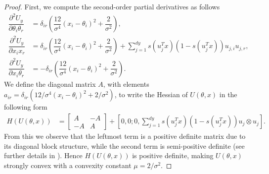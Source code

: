 \documentclass[a4paper, 10pt]{article}
\theoremstyle{plain}%
\begin{document}
\begin{proof}
    First, we compute the second-order partial derivatives as follows
    \begin{align*}
\dfrac{\partial^2 U_y}{\partial \theta_i \theta_r}&=\delta_{ir}\left(\dfrac{12}{\sigma^4}(x_i-\theta_i)^2+\dfrac{2}{\sigma^2}\right),\\
\dfrac{\partial^2 U_y}{\partial x_i x_r}&=\delta_{ir}\left(\dfrac{12}{\sigma^4}(x_i-\theta_i)^2+\dfrac{2}{\sigma^2}\right)+\sum_{j=1}^{dy}s(u_j^Tx)\left(1-s(u_j^Tx)\right)u_{j,i}u_{j,r},\\
\dfrac{\partial^2 U_y}{\partial x_i\theta_r}&=-\delta_{ir}\left(\dfrac{12}{\sigma^4}(x_i-\theta_i)^2+\dfrac{2}{\sigma^2}\right).
\end{align*}
    \noindent We define the diagonal matrix $A$, with elements $a_{ir}=\delta_{ir}\left(12/\sigma^4(x_i-\theta_i)^2+2/\sigma^2\right)$, to write the Hessian of $U(\theta,x)$ in the following form
\begin{align*}H\left(U(\theta,x)\right)&=\begin{bmatrix}
A& -A\\
-A & A
\end{bmatrix}+\left[0,0;0,\sum_{j=1}^{dy}s(u_j^Tx)\left(1-s(u_j^Tx)\right)u_j\otimes u_j\right].
\end{align*} 
From this we observe that the leftmost term is a positive definite matrix due to its diagonal block structure, while the second term is semi-positive definite (see further details in \cite{Kuntz}). Hence $H(U(\theta,x))$ is positive definite, making $U(\theta,x)$ strongly convex with a convexity constant $\mu=2/\sigma^2$. 
\end{proof}
\end{document}
